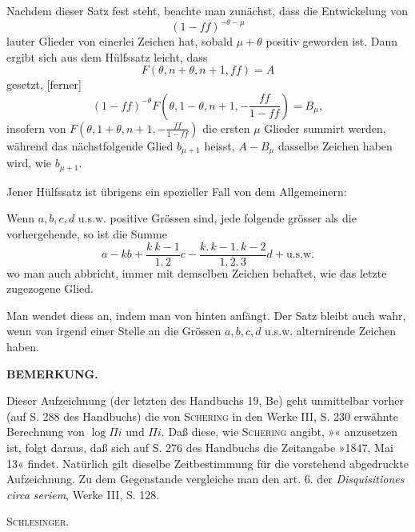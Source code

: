 \clearpage{}
\noindent\hspace*{\parindent}Nachdem dieser Satz fest steht, beachte man zunächst, dass die Entwickelung von
\[
(1-ff)^{-\theta-\mu}
\]
\noindent lauter Glieder von einerlei Zeichen hat, sobald $\mu+\theta$ positiv geworden ist. Dann ergibt sich aus dem Hülfssatz leicht, dass
\[
F(\theta,n+\theta,n+1,ff)=A
\]
\noindent gesetzt, [ferner]
\[
(1-ff)^{-\theta}F\left(\theta,1-\theta,n+1,-\frac{ff}{1-ff}\right)=B_\mu,
\]
\noindent insofern von $F\left(\theta,1+\theta,n+1,-\frac{ff}{1-ff}\right)$ die ersten $\mu$ Glieder summirt werden, während das nächstfolgende Glied $b_{\mu+1}$ heisst, $A-B_\mu$ dasselbe Zeichen haben wird, wie $b_{\mu+1}$.

\indent Jener Hülfssatz ist übrigens ein spezieller Fall von dem Allgemeinern:

\indent Wenn $a,b,c,d$ u.s.w. positive Grössen sind, jede folgende grösser als die vorhergehende, so ist die Summe
\[
a-kb+\frac{k\ k-1}{1{.}\,2}c-\frac{k{.}\,k-1{.}\,k-2}{1{.}\,2{.}\,3}d+\text{u.s.w.}
\]
\noindent wo man auch abbricht, immer mit demselben Zeichen behaftet, wie das letzte zugezogene Glied.

\indent Man wendet diess an, indem man von hinten anfängt. Der Satz bleibt auch wahr, wenn von irgend einer Stelle an die Grössen $a,b,c,d$ u.s.w. alternirende Zeichen haben.
\par\bigskip\begin{center}\bfseries BEMERKUNG.\end{center}
{\small
\noindent\hspace*{\parindent}Dieser Aufzeichnung (der letzten des Handbuchs 19, Be) geht unmittelbar vorher (auf S. 288 des Handbuchs) die von \textsc{Schering} in den  Werke III, S. 230 erwähnte Berechnung von $\log\Pi i$ und $\Pi i$. Daß diese, wie \textsc{Schering} angibt, »« anzusetzen ist, folgt daraus, daß sich auf S. 276 des Handbuchs die Zeitangabe »1847, Mai 13« findet. Natürlich gilt dieselbe Zeitbestimmung für die vorstehend abgedruckte Aufzeichnung. Zu dem Gegenstande vergleiche man den art. 6. der \textit{Disquisitiones circa seriem}, Werke III, S. 128.
\par\smallskip\hfill\textsc{Schlesinger.}\par
}
\ClosingRule
\clearpage
